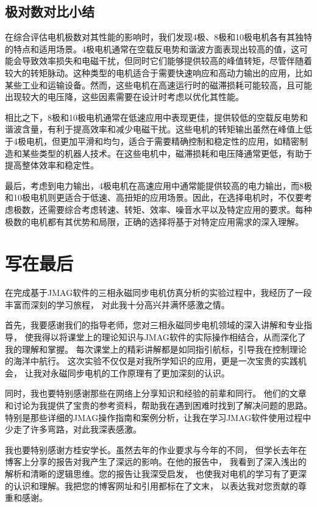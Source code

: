 \documentclass{thuemp}
\begin{document}
\subsection{极对数对比小结}
在综合评估电机极数对其性能的影响时，我们发现4极、8极和10极电机各有其独特的特点和适用场景。4极电机通常在空载反电势和谐波方面表现出较高的值，这可能会导致效率损失和电磁干扰，但同时它们能够提供较高的峰值转矩，尽管伴随着较大的转矩脉动。这种类型的电机适合于需要快速响应和高动力输出的应用，比如某些工业和运输设备。然而，这些电机在高速运行时的磁滞损耗可能较高，且可能出现较大的电压降，这些因素需要在设计时考虑以优化其性能。

相比之下，8极和10极电机通常在低速应用中表现更佳，提供较低的空载反电势和谐波含量，有利于提高效率和减少电磁干扰。这些电机的转矩输出虽然在峰值上低于4极电机，但更加平滑和均匀，适合于需要精确控制和稳定性的应用，如精密制造和某些类型的机器人技术。在这些电机中，磁滞损耗和电压降通常更低，有助于提高整体效率和稳定性。

最后，考虑到电力输出，4极电机在高速应用中通常能提供较高的电力输出，而8极和10极电机则更适合于低速、高扭矩的应用场景。因此，在选择电机时，不仅要考虑极数，还需要综合考虑转速、转矩、效率、噪音水平以及特定应用的要求。每种极数的电机都有其优势和局限，正确的选择将基于对特定应用需求的深入理解。

\section*{写在最后}
在完成基于JMAG软件的三相永磁同步电机仿真分析的实验过程中，我经历了一段丰富而深刻的学习旅程，
对此我十分高兴并满怀感激之情。

首先，我要感谢我们的指导老师，您对三相永磁同步电机领域的深入讲解和专业指导，
使我得以将课堂上的理论知识与JMAG软件的实际操作相结合，从而深化了我的理解和掌握。
每次课堂上的精彩讲解都是如同指引航标，引导我在控制理论的海洋中航行。
这次实验不仅仅是对我所学知识的应用，更是一次宝贵的实践机会，
让我对永磁同步电机的工作原理有了更加深刻的认识。

同时，我也要特别感谢那些在网络上分享知识和经验的前辈和同行。
他们的文章和讨论为我提供了宝贵的参考资料，帮助我在遇到困难时找到了解决问题的思路。
特别是那些详细的JMAG操作指南\cite{IDAJ}\cite{JMAG-C2}\cite{JMAG-C3}和案例分析\cite{JMAG-Course}，让我在学习JMAG软件使用过程中少走了许多弯路，对此我深表感激。

我也要特别感谢方桂安学长。虽然去年的作业要求与今年的不同，
但学长去年在博客上分享的报告\cite{JMAG}对我产生了深远的影响。在他的报告中，
我看到了深入浅出的解析和清晰的逻辑思维。您的报告让我深受启发，
也使我对电机的学习有了更深的认识和理解。我把您的博客网址和引用都标在了文末，
以表达我对您贡献的尊重和感谢。
\end{document}
